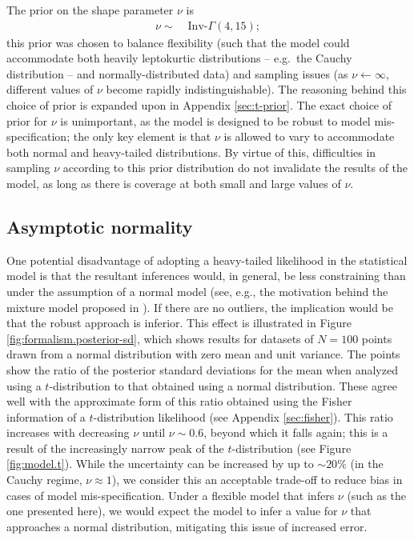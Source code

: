 \documentclass[fleqn,usenatbib]{rasti}
\begin{document}
The prior on the shape parameter $\nu$ is
\begin{align}
    \nu \sim&\; \text{Inv-}\Gamma(4, 15);
\end{align}
this prior was chosen to balance flexibility (such that the model could
accommodate both heavily leptokurtic distributions -- e.g.\ the Cauchy
distribution -- and normally-distributed data) and sampling issues (as $\nu
\leftarrow \infty$, different values of $\nu$ become rapidly indistinguishable).
The reasoning behind this choice of prior is expanded upon in Appendix
\ref{sec:t-prior}. The exact choice of prior for $\nu$ is unimportant, as the
model is designed to be robust to model mis-specification; the only key element
is that $\nu$ is allowed to vary to accommodate both normal and heavy-tailed
distributions. By virtue of this, difficulties in sampling $\nu$ according to
this prior distribution do not invalidate the results of the model, as long as
there is coverage at both small and large values of $\nu$.

\subsection{Asymptotic normality}
\label{sec:formalism.asymptotic}

One potential disadvantage of adopting a heavy-tailed likelihood in the
statistical model is that the resultant inferences would, in general, be less
constraining than under the assumption of a normal model (see, e.g., the
motivation behind the mixture model proposed in \citealt{Tak:2019}).  If there
are no outliers, the implication would be that the robust approach is inferior.
This effect is illustrated in Figure \ref{fig:formalism.posterior-sd}, which
shows results for datasets of $N=100$ points drawn from a normal distribution
with zero mean and unit variance. The points show the ratio of the posterior
standard deviations for the mean when analyzed using a $t$-distribution to that
obtained using a normal distribution. These agree well with the approximate form
of this ratio obtained using the Fisher information of a $t$-distribution
likelihood (see Appendix \ref{sec:fisher}). This ratio increases with decreasing
$\nu$ until $\nu \sim 0.6$, beyond which it falls again; this is a result of the
increasingly narrow peak of the $t$-distribution (see Figure \ref{fig:model.t}).
While the uncertainty can be increased by up to $\sim20\%$ (in the Cauchy
regime, $\nu \approx 1$), we consider this an acceptable trade-off to reduce
bias in cases of model mis-specification. Under a flexible model that infers
$\nu$ (such as the one presented here), we would expect the model to infer a
value for $\nu$ that approaches a normal distribution, mitigating this issue of
increased error.
\end{document}
